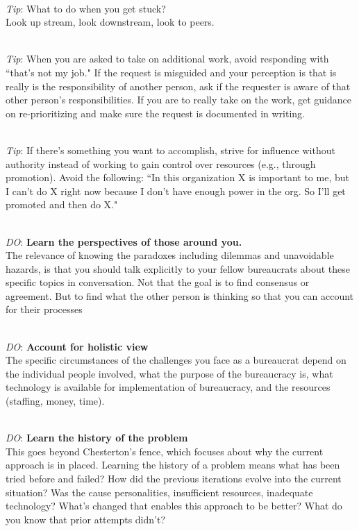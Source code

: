 \ \\
\textit{Tip}: What to do when you get stuck?\\
Look up stream, look downstream, look to peers.

\ \\
\textit{Tip}: When you are asked to take on additional work, avoid responding with ``that's not my job." If the request is misguided and your perception is that is really is the responsibility of another person, ask if the requester is aware of that other person's responsibilities. If you are to really take on the work, get guidance on re-prioritizing and make sure the request is documented in writing. 

\ \\
\textit{Tip}: If there's something you want to accomplish, strive for influence without authority instead of working to gain control over resources (e.g., through promotion). Avoid the following: ``In this organization X is important to me, but I can't do X right now because I don't have enough power in the org. So I'll get promoted and then do X."

\ \\
\textit{DO}: \textbf{Learn the perspectives of those around you.}\\
The relevance of knowing the paradoxes including dilemmas and unavoidable hazards, is that you should talk explicitly to your fellow bureaucrats about these specific topics in conversation. Not that the goal is to find consensus or agreement. But to find what the other person is thinking so that you can account for their processes

\ \\
\textit{DO}: \textbf{Account for holistic view}\\
The specific circumstances of the challenges you face as a bureaucrat depend on the individual people involved, what the purpose of the bureaucracy is, what technology is available for implementation of bureaucracy, and the resources (staffing, money, time). 

\ \\
\textit{DO}: \textbf{Learn the history of the problem}\\
This goes beyond Chesterton's fence, which focuses about why the current approach is in placed. Learning the history of a problem means what has been tried before and failed? How did the previous iterations evolve into the current situation? Was the cause personalities, insufficient resources, inadequate technology? What's changed that enables this approach to be better? What do you know that prior attempts didn't?

